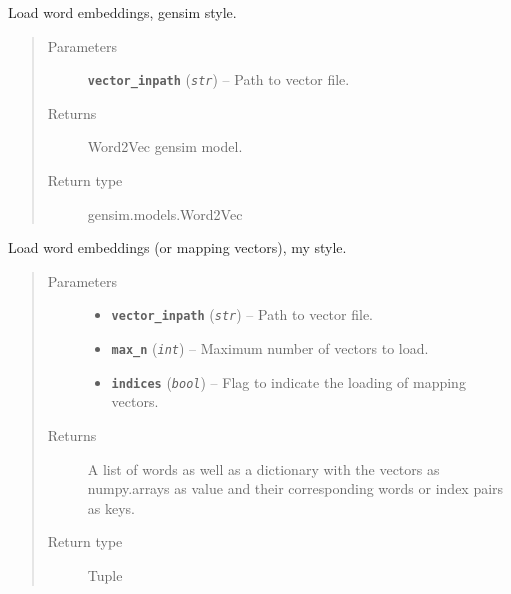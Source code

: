 \documentclass[letterpaper,10pt,english]{sphinxmanual}
\begin{document}

\begin{fulllineitems}
\label{src.misc:src.misc.helpers.load_vectors}
Load word embeddings, gensim style.
\begin{quote}\begin{description}
\item[{Parameters}] \leavevmode
\textbf{\texttt{vector\_inpath}} (\emph{\texttt{str}}) -- Path to vector file.

\item[{Returns}] \leavevmode
Word2Vec gensim model.

\item[{Return type}] \leavevmode
gensim.models.Word2Vec

\end{description}\end{quote}

\end{fulllineitems}


\begin{fulllineitems}
\label{src.misc:src.misc.helpers.load_vectors_from_model}
Load word embeddings (or mapping vectors), my style.
\begin{quote}\begin{description}
\item[{Parameters}] \leavevmode\begin{itemize}
\item {} 
\textbf{\texttt{vector\_inpath}} (\emph{\texttt{str}}) -- Path to vector file.

\item {} 
\textbf{\texttt{max\_n}} (\emph{\texttt{int}}) -- Maximum number of vectors to load.

\item {} 
\textbf{\texttt{indices}} (\emph{\texttt{bool}}) -- Flag to indicate the loading of mapping vectors.

\end{itemize}

\item[{Returns}] \leavevmode
A list of words as well as a dictionary with the vectors as numpy.arrays as value and their
corresponding words or index pairs as keys.

\item[{Return type}] \leavevmode
Tuple

\end{description}\end{quote}

\end{fulllineitems}
\end{document}
